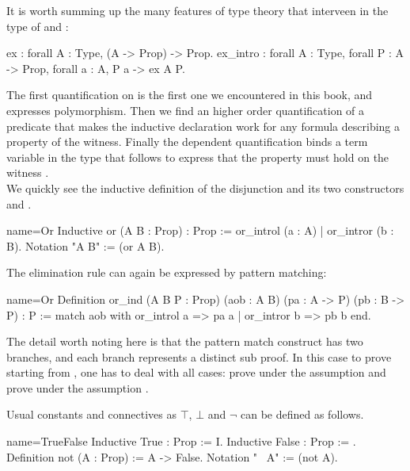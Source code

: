 It is worth summing up the many features of type theory that
interveen in the type of  and :

\begin{coq}{}{}
ex : forall A : Type, (A -> Prop) -> Prop.
ex_intro : forall A : Type, forall P : A -> Prop, forall a : A, P a -> ex A P.
\end{coq}

The first quantification on  is the first one we encountered in this
book, and expresses polymorphism.  Then we find an higher order quantification
of a predicate  that makes the  inductive declaration work
for any formula describing a property of the witness.  Finally
the dependent quantification  binds a term variable 
 in the type that follows to express that the property  must hold
on the witness .\\

We quickly see the inductive definition of the disjunction 
and its two constructors  and .

\begin{coq}{name=Or}{}
Inductive or (A B : Prop) : Prop := or_introl (a : A) | or_intror (b : B).
Notation "A \/ B" := (or A B).
\end{coq}

The elimination rule can again be expressed by pattern matching:

\begin{coq}{name=Or}{}
Definition or_ind (A B P : Prop)
  (aob : A \/ B) (pa : A -> P) (pb : B -> P) : P :=
  match aob with or_introl a => pa a | or_intror b => pb b end.
\end{coq}

The detail worth noting here is that the pattern match construct has two
branches, and each branch represents a distinct sub proof.  In this
case to prove  starting from , one has to deal with all
cases: prove  under the assumption  and prove 
under the assumption .

Usual constants and connectives as $\top$, $\bot$ and $\neg$
can be defined as follows.

\begin{coq}{name=TrueFalse}{}
Inductive True : Prop := I.
Inductive False : Prop := .
Definition not (A : Prop) := A -> False.
Notation "~ A" := (not A).
\end{coq}

